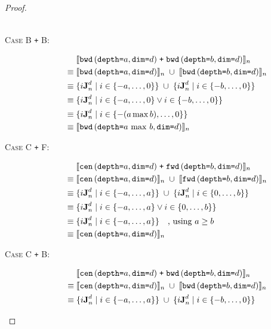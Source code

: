 \begin{proof}
\begin{description}
\begin{align*}
    \end{align*}
  \item[\textsc{Case B \texttt{+} B}:]
    \begin{align*}
      & \; \interp{\stenBwdS{a}{d} \; \texttt{+} \; \stenBwdS{b}{d}}_{n} \\
      \equiv & \; \interp{\stenBwdS{a}{d}}_{n} \; \cup \; \interp{\stenBwdS{b}{d}}_{n} \\
      \equiv & \; \{i\singleEntry{d}{n} \mid i \in \{-a, \ldots, 0\} \} \; \cup \;
                  \{i\singleEntry{d}{n} \mid i \in \{-b, \ldots, 0\} \} \\
      \equiv & \; \{i\singleEntry{d}{n} \mid i \in \{-a, \ldots, 0\}
                    \vee i \in \{-b, \ldots, 0\} \} \\
      \equiv & \; \{i\singleEntry{d}{n} \mid i \in \{- (a \max b), \ldots, 0\} \} \\
      \equiv & \; \interp{\stenBwdS{a \, \max \, b}{d}}_n \\
    \end{align*}
  \item[\textsc{Case C \texttt{+} F}:]
    \begin{align*}
      & \; \interp{\stenCenS{a}{d} \; \texttt{+} \; \stenFwdS{b}{d}}_{n} \\
      \equiv & \; \interp{\stenCenS{a}{d}}_{n} \; \cup \; \interp{\stenFwdS{b}{d}}_{n} \\
      \equiv & \; \{i\singleEntry{d}{n} \mid i \in \{-a, \ldots, a\} \} \; \cup \;
                  \{i\singleEntry{d}{n} \mid i \in \{0, \ldots, b\} \} \\
      \equiv & \; \{i\singleEntry{d}{n} \mid i \in \{-a, \ldots, a\}
                    \vee i \in \{0, \ldots, b\} \} \\
      \equiv & \; \{i\singleEntry{d}{n} \mid i \in \{-a, \ldots, a\} \} \quad \text{, using }a \geq b \\
      \equiv & \; \interp{\stenCenS{a}{d}}_n \\
    \end{align*}
  \item[\textsc{Case C \texttt{+} B}:]
    \begin{align*}
      & \; \interp{\stenCenS{a}{d} \; \texttt{+} \; \stenBwdS{b}{d}}_{n} \\
      \equiv & \; \interp{\stenCenS{a}{d}}_{n} \; \cup \; \interp{\stenBwdS{b}{d}}_{n} \\
      \equiv & \; \{i\singleEntry{d}{n} \mid i \in \{-a, \ldots, a\} \} \; \cup \;
                  \{i\singleEntry{d}{n} \mid i \in \{-b, \ldots, 0\} \} \\

\end{align*}
\end{description}
\end{proof}
